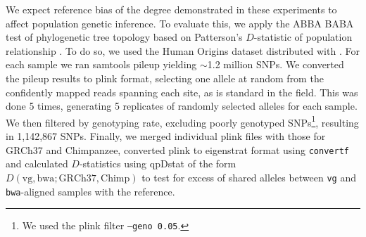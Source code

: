 \documentclass[a4paper,12pt,numbered,oneside]{Classes/PhDThesisPSnPDF}
\providecommand{\DIFaddend}{} %
\begin{document}
\DIFaddend We expect reference bias of the degree demonstrated in these experiments to affect population genetic inference.
To evaluate this, we apply the ABBA BABA test of phylogenetic tree topology based on Patterson's $D$-statistic of population relationship \cite{green2010draft}.
To do so, we used the Human Origins dataset distributed with \cite{lazaridis2014ancient}.
For each sample we ran samtools pileup yielding $\sim$1.2 million SNPs.
We converted the pileup results to plink format, selecting one allele at random from the confidently mapped reads spanning each site, as is standard in the field.
This was done 5 times, generating 5 replicates of randomly selected alleles for each sample.
We then filtered by genotyping rate, excluding poorly genotyped SNPs\footnote{We used the plink filter {\tt --geno 0.05}.}, resulting in 1,142,867 SNPs.
Finally, we merged individual plink files with those for GRCh37 and Chimpanzee, converted plink to eigenstrat format using {\tt convertf} and calculated $D$-statistics using qpDstat \cite{patterson2012ancient} of the form $D(\text{vg}, \text{bwa}; \text{GRCh37}, \text{Chimp})$ to test for excess of shared alleles between {\tt vg} and {\tt bwa}-aligned samples with the reference.
\end{document}
